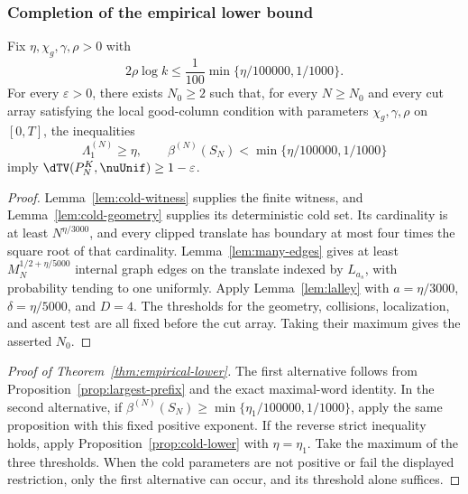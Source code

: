 \subsubsection{Completion of the empirical lower bound}

\begin{proposition}\label{prop:cold-lower}
Fix $\eta,\chi_g,\gamma,\rho>0$ with
\[
 2\rho\log k\le\frac1{100}\min\{\eta/100000,1/1000\}.
\]
For every $\varepsilon>0$, there exists $N_0\ge2$ such that, for every
$N\ge N_0$ and every cut array satisfying the local good-column condition
with parameters $\chi_g,\gamma,\rho$ on $[0,T]$, the inequalities
\[
 \Lambda_1^{(N)}\ge\eta,\qquad
 \beta^{(N)}(S_N)<\min\{\eta/100000,1/1000\}
\]
imply $\dTV(P_N^K,\nuUnif)\ge1-\varepsilon$.
\end{proposition}

\begin{proof}
Lemma~\ref{lem:cold-witness} supplies the finite witness, and
Lemma~\ref{lem:cold-geometry} supplies its deterministic cold set. Its
cardinality is at least $N^{\eta/3000}$, and every clipped translate has
boundary at most four times the square root of that cardinality.
Lemma~\ref{lem:many-edges} gives at least $M_N^{1/2+\eta/5000}$ internal
graph edges on the translate indexed by $L_{a_s}$, with probability tending
to one uniformly. Apply Lemma~\ref{lem:lalley} with $a=\eta/3000$,
$\delta=\eta/5000$, and $D=4$. The thresholds for the geometry, collisions,
localization, and ascent test are all fixed before the cut array. Taking
their maximum gives the asserted $N_0$.
\end{proof}



\begin{proof}[Proof of Theorem~\ref{thm:empirical-lower}]
The first alternative follows from Proposition~\ref{prop:largest-prefix}
and the exact maximal-word identity. In the second alternative, if
$\beta^{(N)}(S_N)\ge\min\{\eta_1/100000,1/1000\}$, apply the same
proposition with this fixed positive exponent. If the reverse strict
inequality holds, apply Proposition~\ref{prop:cold-lower} with
$\eta=\eta_1$. Take the maximum of the three thresholds. When the cold
parameters are not positive or fail the displayed restriction, only the
first alternative can occur, and its threshold alone suffices.
\end{proof}

